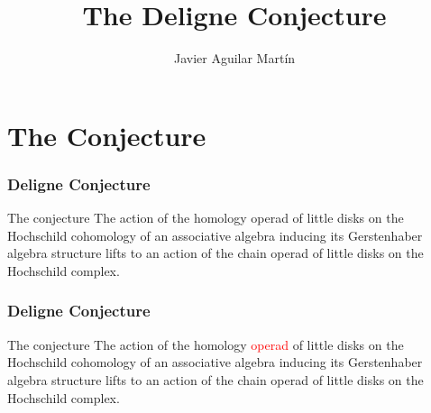 \documentclass{beamer}
\title{The Deligne Conjecture}
\author{Javier Aguilar Mart\'in}
\institute{Universidad de Sevilla}
\date{}
\theoremstyle{definition}
\begin{document}
\frame{\titlepage}
%
% 
% 
% 

% 



\newcommand{\seti}{\setcounter{saveenumi}{\value{enumi}}}
\newcommand{\conti}{\setcounter{enumi}{\value{saveenumi}}}

\makeatletter
\newcommand{\xRightarrow}[2][]{\ext@arrow 0359\Rightarrowfill@{#1}{#2}}
\makeatother


%	
%
\section{The Conjecture}
\begin{frame}
	\frametitle{Deligne Conjecture}
	\begin{block}{The conjecture}
	The action of the homology operad of little disks on the Hochschild cohomology of an associative algebra inducing its Gerstenhaber algebra structure lifts to an action of the chain operad of little disks on the Hochschild complex.
	\end{block}
	
\end{frame}

\begin{frame}
		\frametitle{Deligne Conjecture}
	\begin{block}{The conjecture}
	The action of the homology \textcolor{red}{operad} of little disks on the Hochschild cohomology of an associative algebra inducing its Gerstenhaber algebra structure lifts to an action of the chain operad of little disks on the Hochschild complex.
\end{block}
\end{frame}
\end{document}
